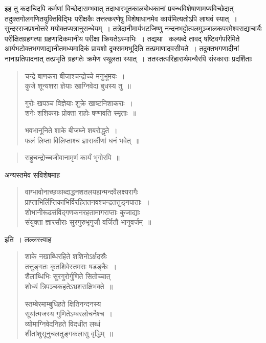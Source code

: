 \documentclass[11pt, openany]{book}
\begin{document}
\indent इह तु कदाचिदपि कर्मणां विच्छेदासम्भवात् तदाधारभूतकालबोधकानां प्रबन्धविशेषाणामप्यविच्छेदात् तदुक्तगोलगणितयुक्तिविद्भिः
परीक्षकैः तत्तत्करणेषु विशेषाधानमेव कार्यमित्यतोऽपि लाघवं स्यात्~। सुन्दरराजप्रश्नोत्तरे मयोक्तप्यत्रानुसन्धेयम्~। तत्रेदानीमार्यभटजिष्णु
नन्दनभट्टोत्पलमुञ्जालकपरमेश्वराद्याचार्यैः परीक्षितग्रहगत्या ग्रहणादिकमानीय परीक्षा क्रियतेऽस्माभिः~। तद्यथा \textendash\ कल्यब्दे तावद्
षष्टिवर्गपरिमिते आर्यभटोक्तभगणाद्यानीतमध्यमादिकं प्रायशो दृक्सममभूदिति तत्प्रमाणादवसीयते~। तदुक्तभगणादीनां नानाप्रतिपादनात्
तत्प्रभृति ग्रहगतेः क्रमेण स्थूलता स्यात्~। ततस्तत्परिहारार्थमन्यैरपि संस्काराः प्रदर्शिताः\textendash 
\begin{quote}
{\qt चन्द्रे बाणकरा बीजाश्चन्द्रोच्चे मनुभूमयः~।\\
 कुजे शून्यशरा ज्ञेयाः खाग्निवेदा बुधस्य तु~॥
 
 गुरोः खपञ्च विज्ञेयाः शुक्रे खाष्टनिशाकराः~।\\
 शनेः शशिकराः प्रोक्ता राहोः षण्णवति स्मृताः~॥
 
 भवभानूनिते शाके बीजघ्ने शबरोद्धृते~।\\
 फलं लिप्ता विलिप्ताश्च ज्ञारार्कीणां धनं भवेत्~॥}
\end{quote}

\newpage

\begin{quote}
{\qt राहुचन्द्रोच्चजीवानामृणं कार्यं भृगोरपि~॥}
\end{quote}

\noindent अन्यस्तमेव सविशेषमाह\textendash 

\begin{quote} 
{\qt वाग्भावोनाच्छकाब्दाद्धनशतलयहान्मन्दवैलक्ष्यरागैः\\
 प्राप्ताभिर्लिप्तिकाभिर्विरहिततनवश्चन्द्रतत्तुङ्गपाताः~।\\
शोभानीरूढसंविद्गणकनरहतामागराप्ताः कुजाद्याः\\
संयुक्ता ज्ञारसौराः सुरगुरुभृगुजौ वर्जितौ भानुवर्जम्~॥}
\end{quote}

\noindent इति~। लल्लस्त्वाह\textendash 
\begin{quote}
{\qt शाके नखाब्धिरहिते शशिनोऽर्क्षदस्रैः\\
 तत्तुङ्गतः कृतशिवेस्तमसः षडङ्कैः~।\\
शैलाब्धिभिः सुरगुरोर्गुणिते सितोच्चात्\\
शोध्यं त्रिपञ्चकहतेऽभ्रशराक्षिभक्ते~॥

स्तम्बेरमाम्बुधिहते क्षितिनन्दनस्य\\
सूर्यात्मजस्य गुणितेऽम्बरलोचनैश्च~।\\
व्योमाग्निवेदनिहते विदधीत लब्धं\\
शीतांशुसूनुचलतुङ्गकलासु वृद्धिम्~॥}
\end{quote}
\end{document}
